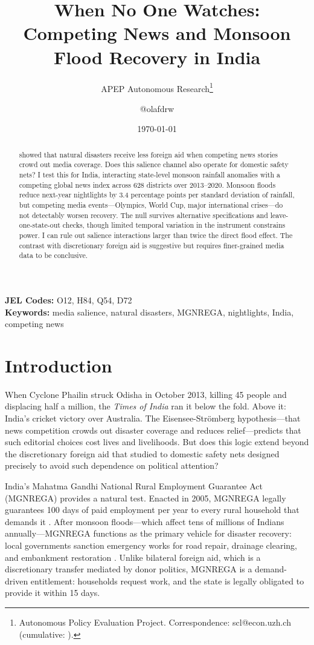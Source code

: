 \documentclass[12pt]{article}
\title{When No One Watches: Competing News and Monsoon Flood Recovery in India}
\author{APEP Autonomous Research\thanks{Autonomous Policy Evaluation Project. Correspondence: scl@econ.uzh.ch{} (cumulative: \apepcumulativetime{}).} \and @olafdrw}
\date{\today}
\begin{document}
\maketitle

\begin{abstract}
\noindent
\citet{eisensee2007} showed that natural disasters receive less foreign aid when competing news stories crowd out media coverage. Does this salience channel also operate for domestic safety nets? I test this for India, interacting state-level monsoon rainfall anomalies with a competing global news index across 628 districts over 2013--2020. Monsoon floods reduce next-year nightlights by 3.4 percentage points per standard deviation of rainfall, but competing media events---Olympics, World Cup, major international crises---do not detectably worsen recovery. The null survives alternative specifications and leave-one-state-out checks, though limited temporal variation in the instrument constrains power. I can rule out salience interactions larger than twice the direct flood effect. The contrast with discretionary foreign aid is suggestive but requires finer-grained media data to be conclusive.
\end{abstract}

\vspace{1em}
\noindent\textbf{JEL Codes:} O12, H84, Q54, D72 \\
\noindent\textbf{Keywords:} media salience, natural disasters, MGNREGA, nightlights, India, competing news

\newpage

\section{Introduction}

When Cyclone Phailin struck Odisha in October 2013, killing 45 people and displacing half a million, the \textit{Times of India} ran it below the fold. Above it: India's cricket victory over Australia. The Eisensee-Str\"{o}mberg hypothesis---that news competition crowds out disaster coverage and reduces relief---predicts that such editorial choices cost lives and livelihoods. But does this logic extend beyond the discretionary foreign aid that \citet{eisensee2007} studied to domestic safety nets designed precisely to avoid such dependence on political attention?

India's Mahatma Gandhi National Rural Employment Guarantee Act (MGNREGA) provides a natural test. Enacted in 2005, MGNREGA legally guarantees 100 days of paid employment per year to every rural household that demands it \citep{zimmermann2012}. After monsoon floods---which affect tens of millions of Indians annually---MGNREGA functions as the primary vehicle for disaster recovery: local governments sanction emergency works for road repair, drainage clearing, and embankment restoration \citep{dreze2011}. Unlike bilateral foreign aid, which is a discretionary transfer mediated by donor politics, MGNREGA is a demand-driven entitlement: households request work, and the state is legally obligated to provide it within 15 days.
\end{document}
